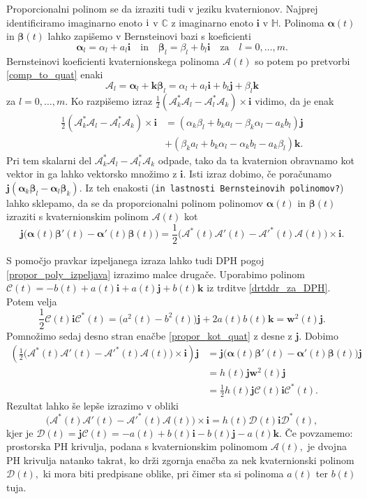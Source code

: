 \documentclass[12pt,a4paper,twoside]{article}
\newcommand{\iu}{\mathrm{i}\mkern1mu} %
\theoremstyle{definition} %
\theoremstyle{plain} %
\numberwithin{equation}{section}  %
\renewcommand{\C}{\mathbb C}
\newcommand{\quat}{\mathbb H}
\newcommand{\iV}{\mathbf{i}}
\newcommand{\jV}{\mathbf{j}}
\newcommand{\kV}{\mathbf{k}}
\newcommand{\wV}{\mathbf{w}}
\newcommand{\AQ}{\mathcal{A}}
\newcommand{\CQ}{\mathcal{C}}
\newcommand{\DQ}{\mathcal{D}}
\newcommand{\balpha}{\boldsymbol \alpha}
\newcommand{\bbeta}{\boldsymbol \beta}
\begin{document}
Proporcionalni polinom se da izraziti tudi v jeziku kvaternionov. Najprej identificiramo imaginarno enoto $\iu$ v $\C$ z imaginarno enoto $\iV$ v $\quat.$ Polinoma $\balpha(t)$ in $\bbeta(t)$ lahko zapišemo v Bernsteinovi bazi s koeficienti
\begin{equation*}
	\balpha_l=\alpha_l+a_l\iV\quad\text{in}\quad\bbeta_l=\beta_l+b_l\iV\quad\text{za}\quad l=0,\dots,m.
\end{equation*}
Bernsteinovi koeficienti kvaternionskega polinoma $\AQ(t)$ so potem po pretvorbi \eqref{comp_to_quat} enaki
\begin{equation*}
	\AQ_l=\balpha_l+\kV\bbeta_l=\alpha_l+a_l\iV+b_l\jV+\beta_l\kV
\end{equation*}
za $l=0,\dots,m.$ Ko razpišemo izraz $\frac{1}{2}(\AQ_k^*\AQ_l-\AQ_l^*\AQ_k)\times\iV$ vidimo, da je enak
\begin{align*}
	\frac{1}{2}(\AQ_k^*\AQ_l-\AQ_l^*\AQ_k)\times\iV&=(\alpha_k\beta_l+b_ka_l-\beta_k\alpha_l-a_kb_l)\jV\\
	&+(\beta_ka_l+b_k\alpha_l-\alpha_kb_l-a_k\beta_l)\kV.
\end{align*}
Pri tem skalarni del $\AQ_k^*\AQ_l-\AQ_l^*\AQ_k$ odpade, tako da ta kvaternion obravnamo kot vektor in ga lahko vektorsko množimo z $\iV.$ Isti izraz dobimo, če poračunamo $\jV(\balpha_k\bbeta_l-\balpha_l\bbeta_k).$ Iz teh enakosti (\texttt{in lastnosti Bernsteinovih polinomov?}) lahko sklepamo, da se da proporcionalni polinom polinomov $\balpha(t)$ in $\bbeta(t)$ izraziti s kvaternionskim polinom $\AQ(t)$ kot
\begin{equation}
	\label{propor_kot_quat}
	\jV\big(\balpha(t)\bbeta'(t)-\balpha'(t)\bbeta(t)\big)=\frac{1}{2}\big(\AQ^*(t)\AQ'(t)-\AQ'^*(t)\AQ(t)\big)\times\iV.
\end{equation}

S pomočjo pravkar izpeljanega izraza lahko tudi DPH pogoj \eqref{propor_poly_izpeljava} izrazimo malce drugače. Uporabimo polinom $\CQ(t)=-b(t)+a(t)\iV+a(t)\jV+b(t)\kV$ iz trditve \ref{drtddr_za_DPH}. Potem velja
\begin{equation*}
	\frac{1}{2}\CQ(t)\iV\CQ^*(t)=\big(a^2(t)-b^2(t)\big)\jV+2a(t)b(t)\kV=\wV^2(t)\jV.
\end{equation*}
Pomnožimo sedaj desno stran enačbe \eqref{propor_kot_quat} z desne z $\jV.$ Dobimo
\begin{align*}
	\left(\frac{1}{2}\big(\AQ^*(t)\AQ'(t)-\AQ'^*(t)\AQ(t)\big)\times\iV\right)\jV&=\jV\big(\balpha(t)\bbeta'(t)-\balpha'(t)\bbeta(t)\big)\jV\\
	&=h(t)\jV\wV^2(t)\jV\\
	&=\frac{1}{2}h(t)\jV\CQ(t)\iV\CQ^*(t).
\end{align*}
Rezultat lahko še lepše izrazimo v obliki
\begin{equation}
	\label{dvojnaPH_quat_pogoj}
	\big(\AQ^*(t)\AQ'(t)-\AQ'^*(t)\AQ(t)\big)\times\iV=h(t)\DQ(t)\iV\DQ^*(t),
\end{equation}
kjer je $\DQ(t)=\jV\CQ(t)=-a(t)+b(t)\iV-b(t)\jV-a(t)\kV.$ Če povzamemo: prostorska PH krivulja, podana s kvaternionskim polinomom $\AQ(t),$ je dvojna PH krivulja natanko takrat, ko drži zgornja enačba za nek kvaternionski polinom $\DQ(t),$ ki mora biti predpisane oblike, pri čimer sta si polinoma $a(t)$ ter $b(t)$ tuja.
\end{document}
